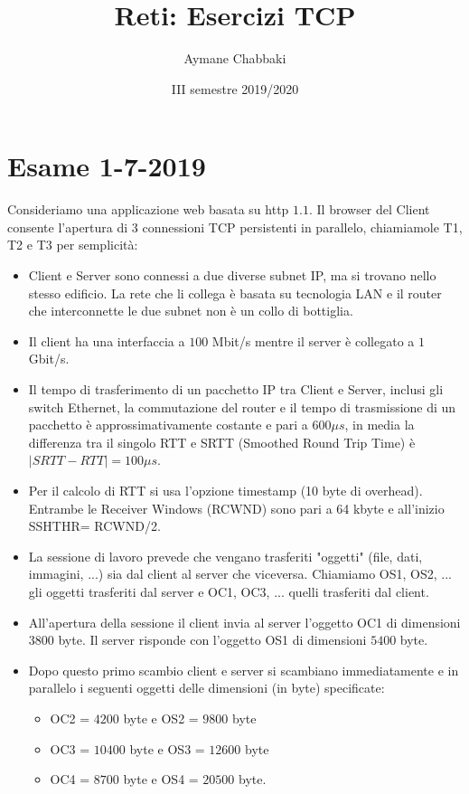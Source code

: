 \documentclass[10pt]{article}
\title{Reti: Esercizi TCP}
\author{Aymane Chabbaki}
\date{III semestre 2019/2020}
\begin{document}
	\section{Esame 1-7-2019}
	Consideriamo una applicazione web basata su http $1.1.$ Il browser del Client consente l'apertura di $3$ connessioni TCP persistenti in parallelo, chiamiamole T1, T2 e T3 per semplicità:
	\begin{itemize}
		\item Client e Server sono connessi a due diverse subnet IP, ma si trovano nello stesso edificio. La rete che li collega è basata su tecnologia LAN e il router che interconnette le due subnet non è un collo di bottiglia. 
		\item Il client ha una interfaccia a $100$ Mbit/s mentre il server è collegato a $1$ Gbit/s. 
		\item Il tempo di trasferimento di un pacchetto IP tra Client e Server, inclusi gli switch Ethernet, la commutazione del router e il tempo di trasmissione di un pacchetto è approssimativamente costante e pari a $600 \mu s$, in media la differenza tra il singolo RTT e SRTT (Smoothed Round Trip Time) è $|SRTT - RTT| = 100 \mu s$. 
		\item
	Per il calcolo di RTT si usa l'opzione timestamp (10 byte di overhead). Entrambe le Receiver Windows (RCWND) sono pari a 64 kbyte e all'inizio SSHTHR= RCWND/2.
		\item La sessione di lavoro prevede che vengano trasferiti "oggetti" (file, dati, immagini, ...) sia dal client al server che viceversa. Chiamiamo OS1, OS2, ... gli oggetti trasferiti dal server e OC1, OC3, ... quelli trasferiti dal client.
		\item All'apertura della sessione il client invia al server l'oggetto OC1 di dimensioni $3800$ byte. Il server risponde con l'oggetto OS1 di dimensioni $5400$ byte.
		\item Dopo questo primo scambio client e server si scambiano immediatamente e in parallelo i seguenti oggetti delle dimensioni (in byte) specificate: 
		\begin{itemize}
			\item OC2 = $4200$ byte e OS2 = $9800$ byte
			\item OC3 = $10400$ byte e OS3 = $12600$ byte 
			\item OC4 = $8700$ byte e OS4 = $20500$ byte.
		\end{itemize}
	\end{itemize}
\end{document}
